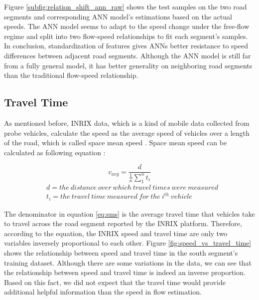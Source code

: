 \documentclass[english]{kththesis}
\begin{document}
Figure \ref{subfig:relation_shift_ann_raw} shows the test samples on the two road segments and corresponding ANN model's estimations based on the actual speeds. The ANN model seems to adapt to the speed change under the free-flow regime and split into two flow-speed relationships to fit each segment's samples. In conclusion, standardization of features gives ANNs better resistance to speed differences between adjacent road segments. Although the ANN model is still far from a fully general model, it has better generality on neighboring road segments than the traditional flow-speed relationship.

\subsection{Travel Time}
\label{subsec:discussionTravelTime}

As mentioned before, INRIX data, which is a kind of mobile data collected from probe vehicles, calculate the speed as the average speed of vehicles over a length of the road, which is called space mean speed \cite{sharma_inrix_data_opportunity, Ahsani_inrix_data_quantity}. Space mean speed can be calculated as following equation \cite{elefteriadou_traffic_flow_theory}:

\begin{equation}
    v_{avg} = \frac{d}{\frac{1}{n}\sum_{1}^{n}t_{i}}
    \label{eq:sms}
\end{equation}
\begin{align*}
    & d = the \ distance \ over \ which \ travel \ times \ were \ measured\\ 
    & t_i = the \ travel \ time \ measured \ for \ the \ i^{th} \ vehicle
\end{align*}

The denominator in equation \ref{eq:sms} is the average travel time that vehicles take to travel across the road segment reported by the INRIX platform. Therefore, according to the equation, the INRIX speed and travel time are only two variables inversely proportional to each other. Figure \ref{fig:speed_vs_travel_time} shows the relationship between speed and travel time in the south segment's training dataset. Although there are some variations in the data, we can see that the relationship between speed and travel time is indeed an inverse proportion. Based on this fact, we did not expect that the travel time would provide additional helpful information than the speed in flow estimation.
\end{document}
